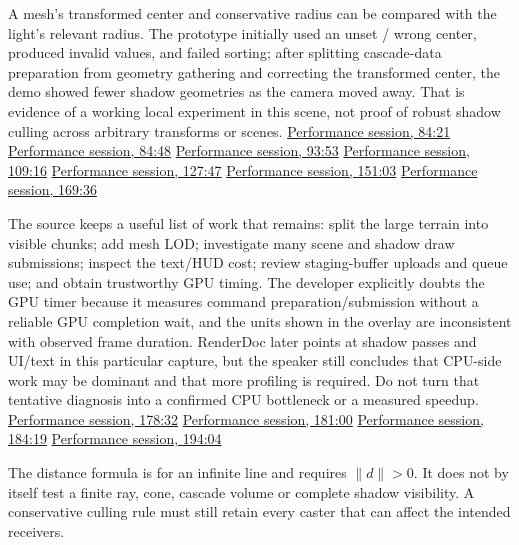 A mesh's transformed center and conservative radius can be compared with the light's relevant radius. The prototype initially used an unset / wrong center, produced invalid values, and failed sorting; after splitting cascade-data preparation from geometry gathering and correcting the transformed center, the demo showed fewer shadow geometries as the camera moved away. That is evidence of a working local experiment in this scene, not proof of robust shadow culling across arbitrary transforms or scenes. \href{https://www.youtube.com/watch?v=dJYWL9YAelY&t=5061s}{Performance session, 84:21} \href{https://www.youtube.com/watch?v=dJYWL9YAelY&t=5088s}{Performance session, 84:48} \href{https://www.youtube.com/watch?v=dJYWL9YAelY&t=5633s}{Performance session, 93:53} \href{https://www.youtube.com/watch?v=dJYWL9YAelY&t=6556s}{Performance session, 109:16} \href{https://www.youtube.com/watch?v=dJYWL9YAelY&t=7667s}{Performance session, 127:47} \href{https://www.youtube.com/watch?v=dJYWL9YAelY&t=9063s}{Performance session, 151:03} \href{https://www.youtube.com/watch?v=dJYWL9YAelY&t=10176s}{Performance session, 169:36}

The source keeps a useful list of work that remains: split the large terrain into visible chunks; add mesh LOD; investigate many scene and shadow draw submissions; inspect the text/HUD cost; review staging-buffer uploads and queue use; and obtain trustworthy GPU timing. The developer explicitly doubts the GPU timer because it measures command preparation/submission without a reliable GPU completion wait, and the units shown in the overlay are inconsistent with observed frame duration. RenderDoc later points at shadow passes and UI/text in this particular capture, but the speaker still concludes that CPU-side work may be dominant and that more profiling is required. Do not turn that tentative diagnosis into a confirmed CPU bottleneck or a measured speedup. \href{https://www.youtube.com/watch?v=dJYWL9YAelY&t=10712s}{Performance session, 178:32} \href{https://www.youtube.com/watch?v=dJYWL9YAelY&t=10857s}{Performance session, 181:00} \href{https://www.youtube.com/watch?v=dJYWL9YAelY&t=11059s}{Performance session, 184:19} \href{https://www.youtube.com/watch?v=dJYWL9YAelY&t=11644s}{Performance session, 194:04}

The distance formula is for an infinite line and requires \(\lVert d\rVert>0\). It does not by itself test a finite ray, cone, cascade volume or complete shadow visibility. A conservative culling rule must still retain every caster that can affect the intended receivers.

